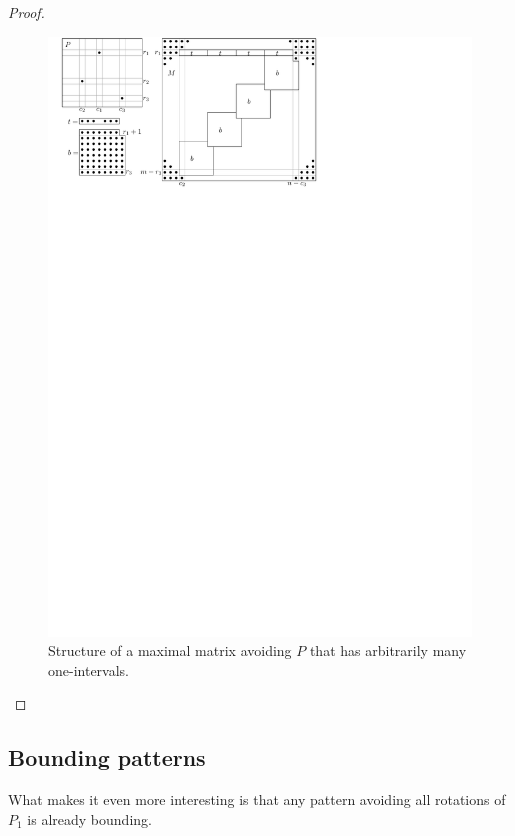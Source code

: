 \begin{proof}
\begin{figure}[!ht]
\centering
\includegraphics[width=120mm]{img/manyints.pdf}
\caption{Structure of a maximal matrix avoiding $P$ that has arbitrarily many one-intervals.}
\label{fig:manyints}
\end{figure}
\end{proof}

\subsection{Bounding patterns}

What makes it even more interesting is that any pattern avoiding all rotations of $P_1$ is already bounding.

